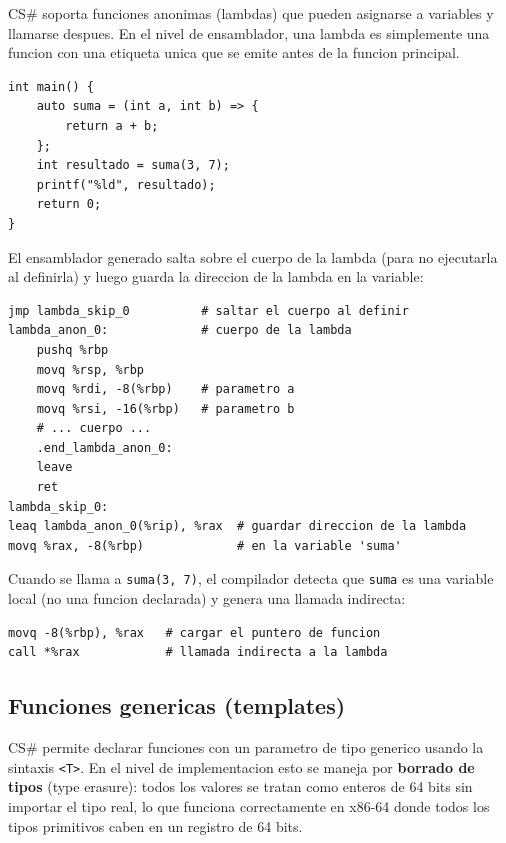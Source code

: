 \documentclass[12pt, a4paper]{article}
\begin{document}
CS\# soporta funciones anonimas (lambdas) que pueden asignarse a variables y llamarse despues. En el nivel de ensamblador, una lambda es simplemente una funcion con una etiqueta unica que se emite antes de la funcion principal.

\begin{lstlisting}[style=csstyle, caption={Uso de lambdas en CS\#}]
int main() {
    auto suma = (int a, int b) => {
        return a + b;
    };
    int resultado = suma(3, 7);
    printf("%ld", resultado);
    return 0;
}
\end{lstlisting}

El ensamblador generado salta sobre el cuerpo de la lambda (para no ejecutarla al definirla) y luego guarda la direccion de la lambda en la variable:

\begin{lstlisting}[style=asmstyle, caption={Ensamblador generado para una lambda}]
jmp lambda_skip_0          # saltar el cuerpo al definir
lambda_anon_0:             # cuerpo de la lambda
    pushq %rbp
    movq %rsp, %rbp
    movq %rdi, -8(%rbp)    # parametro a
    movq %rsi, -16(%rbp)   # parametro b
    # ... cuerpo ...
    .end_lambda_anon_0:
    leave
    ret
lambda_skip_0:
leaq lambda_anon_0(%rip), %rax  # guardar direccion de la lambda
movq %rax, -8(%rbp)             # en la variable 'suma'
\end{lstlisting}

Cuando se llama a \texttt{suma(3, 7)}, el compilador detecta que \texttt{suma} es una variable local (no una funcion declarada) y genera una llamada indirecta:

\begin{lstlisting}[style=asmstyle, caption={Llamada indirecta a una lambda}]
movq -8(%rbp), %rax   # cargar el puntero de funcion
call *%rax            # llamada indirecta a la lambda
\end{lstlisting}

\subsection{Funciones genericas (templates)}

CS\# permite declarar funciones con un parametro de tipo generico usando la sintaxis \texttt{<T>}. En el nivel de implementacion esto se maneja por \textbf{borrado de tipos} (type erasure): todos los valores se tratan como enteros de 64 bits sin importar el tipo real, lo que funciona correctamente en x86-64 donde todos los tipos primitivos caben en un registro de 64 bits.
\end{document}
